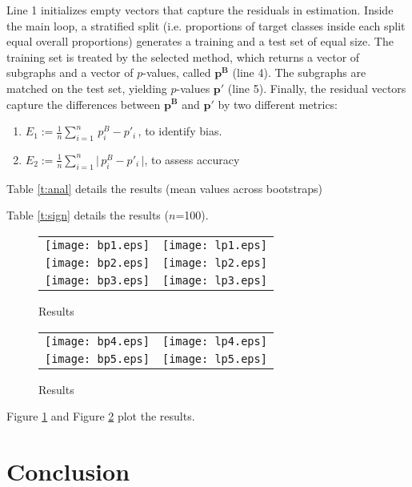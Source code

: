 \documentclass{article}
\begin{document}
Line 1 initializes empty vectors that capture the residuals in
estimation. Inside the main loop, a stratified split (i.e. proportions of
target classes inside each split equal overall proportions) generates a training
and a test set of equal size. The training set is treated by the selected method,
which returns a vector of subgraphs and a vector of $p$-values, called
$\mathbf{p^B}$ (line 4). The subgraphs are matched on the test set, yielding
$p$-values $\mathbf{p'}$ (line 5). Finally, the residual vectors capture the
differences between $\mathbf{p^B}$ and  $\mathbf{p'}$ by two different metrics:

\begin{enumerate}
  \item $E_1 := \frac{1}{n} \sum_{i=1}^n \,p^B_i -p'_i \,$, to identify bias.
  \item $E_2 := \frac{1}{n} \sum_{i=1}^n \Big|\,p^B_i -p'_i \,\Big|$, to assess accuracy
\end{enumerate}

Table \ref{t:anal} details the results (mean values across bootstraps)


Table \ref{t:sign} details the results ($n$=100). 


\begin{figure}[t]
  \begin{tabular}{cc}
   \texttt{[image: bp1.eps]} & \texttt{[image: lp1.eps]} \\
   \texttt{[image: bp2.eps]} & \texttt{[image: lp2.eps]} \\
   \texttt{[image: bp3.eps]} & \texttt{[image: lp3.eps]} \\
  \end{tabular}
  \caption{Results}
  \label{fig:bplp13}
\end{figure}

\begin{figure}[t]
  \begin{tabular}{cc}
   \texttt{[image: bp4.eps]} & \texttt{[image: lp4.eps]} \\
   \texttt{[image: bp5.eps]} & \texttt{[image: lp5.eps]} \\
  \end{tabular}
  \caption{Results}
  \label{fig:bplp45}
\end{figure}

Figure \ref{fig:bplp13} and Figure \ref{fig:bplp45} plot the results.

\section{Conclusion}
\label{s:Conclusion}




\end{document}
